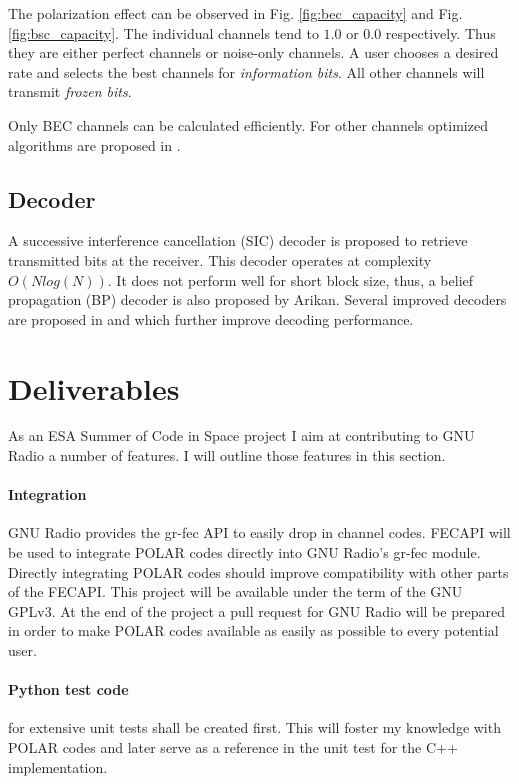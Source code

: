 \documentclass[a4paper,12pt]{scrartcl}
\begin{document}
The polarization effect can be observed in Fig. \ref{fig:bec_capacity} and Fig. \ref{fig:bsc_capacity}.
The individual channels tend to $1.0$ or $0.0$ respectively.
Thus they are either perfect channels or noise-only channels.
A user chooses a desired rate and selects the best channels for \textit{information bits}.
All other channels will transmit \textit{frozen bits}.

Only BEC channels can be calculated efficiently.
For other channels optimized algorithms are proposed in \cite{tal2013construct}.

\subsection{Decoder}
A successive interference cancellation (SIC) decoder is proposed to retrieve transmitted bits at the receiver.
This decoder operates at complexity $O( N log(N) )$.
It does not perform well for short block size, thus, a belief propagation (BP) decoder is also proposed by Arikan.
Several improved decoders are proposed in \cite{chen2013improved} and \cite{li2012adaptive} which further improve decoding performance.


\section{Deliverables}
As an ESA Summer of Code in Space project I aim at contributing to GNU Radio a number of features.
I will outline those features in this section.

\paragraph{Integration} GNU Radio provides the gr-fec API to easily drop in channel codes.
FECAPI will be used to integrate POLAR codes directly into GNU Radio's gr-fec module.
Directly integrating POLAR codes should improve compatibility with other parts of the FECAPI.
This project will be available under the term of the GNU GPLv3.
At the end of the project a pull request for GNU Radio will be prepared in order to make POLAR codes available as easily as possible to every potential user.

\paragraph{Python test code} for extensive unit tests shall be created first.
This will foster my knowledge with POLAR codes and later serve as a reference in the unit test for the C++ implementation.
\end{document}

